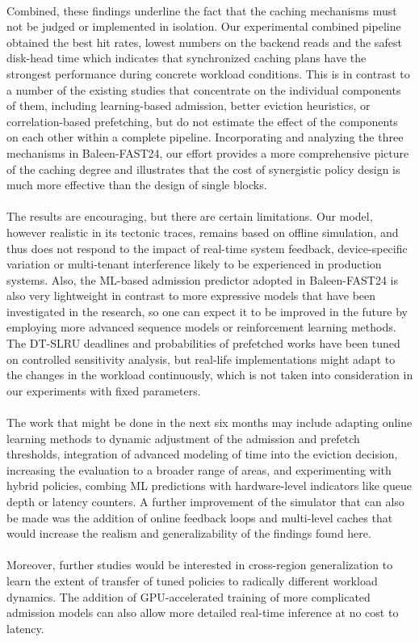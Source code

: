 \documentclass[sigconf]{acmart}
\begin{document}
{\\Combined, these findings underline the fact that the caching mechanisms must not be judged or implemented in isolation. Our experimental combined pipeline obtained the best hit rates, lowest numbers on the backend reads and the safest disk-head time which indicates that synchronized caching plans have the strongest performance during concrete workload conditions. This is in contrast to a number of the existing studies that concentrate on the individual components of them, including learning-based admission, better eviction heuristics, or correlation-based prefetching, but do not estimate the effect of the components on each other within a complete pipeline. Incorporating and analyzing the three mechanisms in Baleen-FAST24, our effort provides a more comprehensive picture of the caching degree and illustrates that the cost of synergistic policy design is much more effective than the design of single blocks.\\
\\The results are encouraging, but there are certain limitations. Our model, however realistic in its tectonic traces, remains based on offline simulation, and thus does not respond to the impact of real-time system feedback, device-specific variation or multi-tenant interference likely to be experienced in production systems. Also, the ML-based admission predictor adopted in Baleen-FAST24 is also very lightweight in contrast to more expressive models that have been investigated in the research, so one can expect it to be improved in the future by employing more advanced sequence models or reinforcement learning methods. The DT-SLRU deadlines and probabilities of prefetched works have been tuned on controlled sensitivity analysis, but real-life implementations might adapt to the changes in the workload continuously, which is not taken into consideration in our experiments with fixed parameters.\\
\\The work that might be done in the next six months may include adapting online learning methods to dynamic adjustment of the admission and prefetch thresholds, integration of advanced modeling of time into the eviction decision, increasing the evaluation to a broader range of areas, and experimenting with hybrid policies, combing ML predictions with hardware-level indicators like queue depth or latency counters. A further improvement of the simulator that can also be made was the addition of online feedback loops and multi-level caches that would increase the realism and generalizability of the findings found here.\\
\\Moreover, further studies would be interested in cross-region generalization to learn the extent of transfer of tuned policies to radically different workload dynamics. The addition of GPU-accelerated training of more complicated admission models can also allow more detailed real-time inference at no cost to latency.

}
\end{document}
